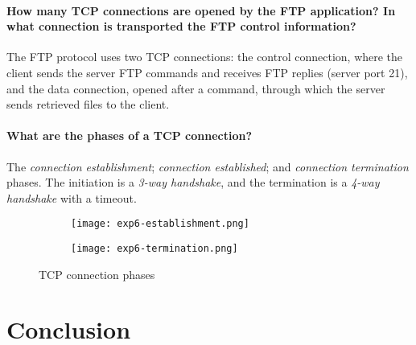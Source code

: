 \documentclass[compilation.tex]{subfiles}
\begin{document}
\paragraph{How many TCP connections are opened by the FTP application? In what connection is transported the FTP control information?}
The FTP protocol uses two TCP connections: the control connection, where the client sends the server FTP commands and receives FTP replies (server port 21), and the data connection, opened after a  command, through which the server sends retrieved files to the client.

\paragraph{What are the phases of a TCP connection?}
The \textsl{connection establishment}; \textsl{connection established}; and \textsl{connection termination} phases. The initiation is a \textit{3-way handshake}, and the termination is a \textit{4-way handshake} with a timeout.

\begin{figure}[hbt]
\centering
\begin{subfigure}[b]{\textwidth}
	\centering
	\texttt{[image: exp6-establishment.png]}
	\vspace*{.8\baselineskip}
\end{subfigure}
\begin{subfigure}[b]{\textwidth}
	\centering
	\texttt{[image: exp6-termination.png]}
	\vspace*{.8\baselineskip}
\end{subfigure}
\caption{TCP connection phases}
\label{fig:exp6-phases}
\end{figure}


\section{Conclusion}
\label{sec:conclusion}
\end{document}

